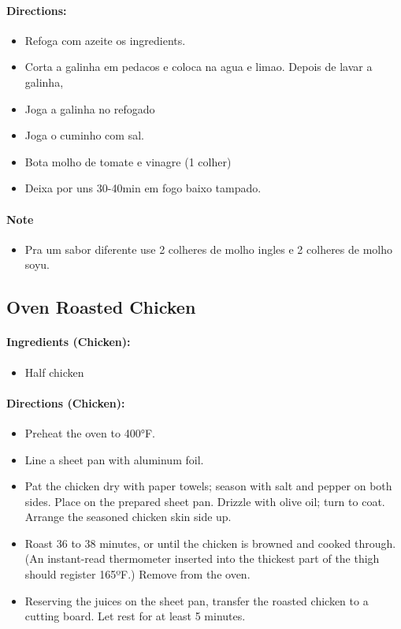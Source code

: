 \documentclass{article}
\begin{document}
\paragraph{Directions:}
\begin{itemize}
	\item Refoga com azeite os ingredients.
	\item Corta a galinha em pedacos e coloca na agua e limao. Depois de lavar a galinha,
	\item Joga a galinha no refogado
	\item Joga o cuminho com sal.
	\item Bota molho de tomate e vinagre (1 colher)
	\item Deixa por uns 30-40min em fogo baixo tampado.
\end{itemize}

\paragraph{Note}
\begin{itemize}
	\item Pra um sabor diferente use 2 colheres de molho ingles e 2 colheres de molho soyu.
\end{itemize}

\subsection{Oven Roasted Chicken}

\paragraph{Ingredients (Chicken):}
\begin{itemize}
	\item Half chicken
\end{itemize}

\paragraph{Directions (Chicken):}
\begin{itemize}
	\item Preheat the oven to 400°F. 
	\item Line a sheet pan with aluminum foil. 
	\item Pat the chicken dry with paper towels; season with salt and pepper on
	both sides. Place on the prepared sheet pan. Drizzle with olive oil; turn
	to coat. Arrange the seasoned chicken skin side up. 
	\item Roast 36 to 38 minutes, or until the chicken is browned and cooked
	through. (An instant-read thermometer inserted into the thickest part
	of the thigh should register 165ºF.) Remove from the oven. 
	\item Reserving the juices on the sheet pan, transfer the roasted chicken to a
	cutting board. Let rest for at least 5 minutes.
\end{itemize}
\end{document}
